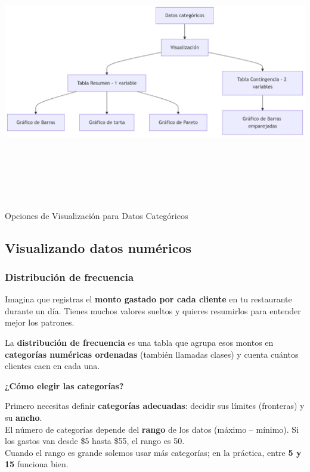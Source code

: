 \documentclass[
  spanish,
  letterpaper,
  DIV=11,
  numbers=noendperiod]{scrreprt}
\begin{document}
\includegraphics[width=10.13in,height=4.48in]{capitulo2_files/figure-latex/mermaid-figure-2.png}

Opciones de Visualización para Datos Categóricos

\subsection{Visualizando datos
numéricos}\label{visualizando-datos-numuxe9ricos}

\subsubsection{Distribución de
frecuencia}\label{distribuciuxf3n-de-frecuencia}

Imagina que registras el \textbf{monto gastado por cada cliente} en tu
restaurante durante un día. Tienes muchos valores sueltos y quieres
resumirlos para entender mejor los patrones.

La \textbf{distribución de frecuencia} es una tabla que agrupa esos
montos en \textbf{categorías numéricas ordenadas} (también llamadas
clases) y cuenta cuántos clientes caen en cada una.

\textbf{¿Cómo elegir las categorías?}

Primero necesitas definir \textbf{categorías adecuadas}: decidir sus
límites (fronteras) y su \textbf{ancho}.\\
El número de categorías depende del \textbf{rango} de los datos (máximo
-- mínimo). Si los gastos van desde \$5 hasta \$55, el rango es 50.\\
Cuando el rango es grande solemos usar más categorías; en la práctica,
entre \textbf{5 y 15} funciona bien.
\end{document}
